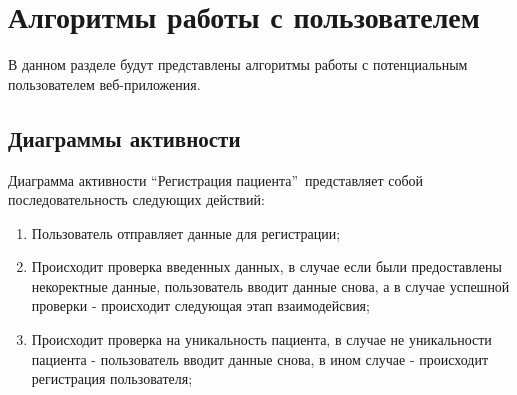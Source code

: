 \chapter{Алгоритмы работы с пользователем}

    В данном разделе будут представлены алгоритмы работы с потенциальным пользователем %
    веб-приложения.

    \section{Диаграммы активности}
        Диаграмма активности  “Регистрация пациента”\ представляет %
        собой последовательность следующих действий:
        \begin{enumerate}
            \item Пользователь отправляет данные для регистрации;
            \item Происходит проверка введенных данных, в случае если были предоставлены %
            некоректные данные, пользователь вводит данные снова, а в %
            случае успешной проверки - происходит следующая этап взаимодейсвия;
            \item Происходит проверка на уникальность пациента, в %
            случае не уникальности пациента - пользователь вводит данные %
            снова, в ином случае - происходит регистрация пользователя;
        \end{enumerate}

